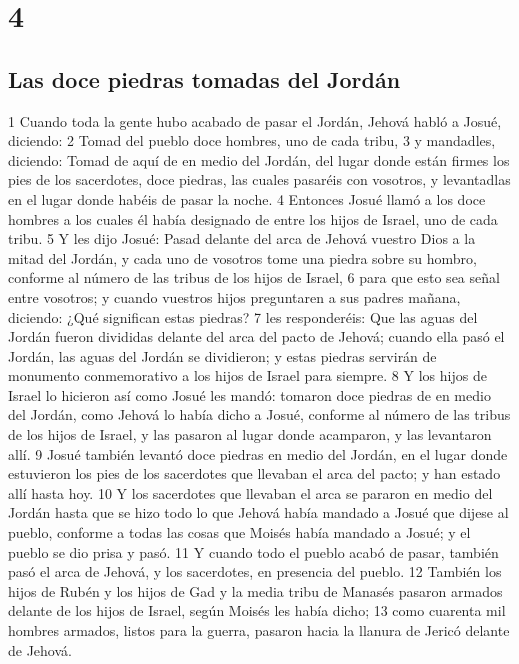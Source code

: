 \chapter{4}

\section*{Las doce piedras tomadas del Jordán}


1 Cuando toda la gente hubo acabado de pasar el Jordán, Jehová habló a Josué, diciendo:
2 Tomad del pueblo doce hombres, uno de cada tribu,
3 y mandadles, diciendo: Tomad de aquí de en medio del Jordán, del lugar donde están firmes los pies de los sacerdotes, doce piedras, las cuales pasaréis con vosotros, y levantadlas en el lugar donde habéis de pasar la noche.
4 Entonces Josué llamó a los doce hombres a los cuales él había designado de entre los hijos de Israel, uno de cada tribu.
5 Y les dijo Josué: Pasad delante del arca de Jehová vuestro Dios a la mitad del Jordán, y cada uno de vosotros tome una piedra sobre su hombro, conforme al número de las tribus de los hijos de Israel,
6 para que esto sea señal entre vosotros; y cuando vuestros hijos preguntaren a sus padres mañana, diciendo: ¿Qué significan estas piedras?
7 les responderéis: Que las aguas del Jordán fueron divididas delante del arca del pacto de Jehová; cuando ella pasó el Jordán, las aguas del Jordán se dividieron; y estas piedras servirán de monumento conmemorativo a los hijos de Israel para siempre.
8 Y los hijos de Israel lo hicieron así como Josué les mandó: tomaron doce piedras de en medio del Jordán, como Jehová lo había dicho a Josué, conforme al número de las tribus de los hijos de Israel, y las pasaron al lugar donde acamparon, y las levantaron allí.
9 Josué también levantó doce piedras en medio del Jordán, en el lugar donde estuvieron los pies de los sacerdotes que llevaban el arca del pacto; y han estado allí hasta hoy.
10 Y los sacerdotes que llevaban el arca se pararon en medio del Jordán hasta que se hizo todo lo que Jehová había mandado a Josué que dijese al pueblo, conforme a todas las cosas que Moisés había mandado a Josué; y el pueblo se dio prisa y pasó.
11 Y cuando todo el pueblo acabó de pasar, también pasó el arca de Jehová, y los sacerdotes, en presencia del pueblo.
12 También los hijos de Rubén y los hijos de Gad y la media tribu de Manasés pasaron armados delante de los hijos de Israel, según Moisés les había dicho;
13 como cuarenta mil hombres armados, listos para la guerra, pasaron hacia la llanura de Jericó delante de Jehová.
